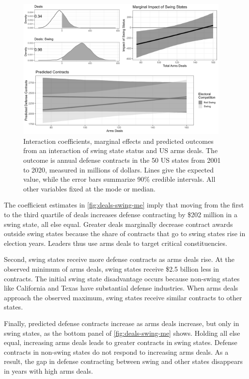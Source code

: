 \documentclass[12pt]{article}
\begin{document}
\begin{figure}[htpb]
	\centering
		\includegraphics[width=0.95\textwidth]{../figures/deals-swing-me.png}
	\caption{Interaction coefficients, marginal effects and predicted outcomes from an interaction of swing state status and US arms deals. The outcome is annual defense contracts in the 50 US states from 2001 to 2020, measured in millions of dollars. Lines give the expected value, while the error bars summarize 90\% credible intervals. All other variables fixed at the mode or median.}
	\label{fig:deals-swing-me}
\end{figure}


The coefficient estimates in \autoref{fig:deals-swing-me} imply that moving from the first to the third quartile of deals increases defense contracting by \$202 million in a swing state, all else equal. 
Greater deals marginally decrease contract awards outside swing states because the share of contracts that go to swing states rise in election years. 
Leaders thus use arms deals to target critical constituencies.


Second, swing states receive more defense contracts as arms deals rise. 
At the observed minimum of arms deals, swing states receive \$2.5 billion less in contracts.
The initial swing state disadvantage occurs because non-swing states like California and Texas have substantial defense industries.
When arms deals approach the observed maximum, swing states receive similar contracts to other states. 


Finally, predicted defense contracts increase as arms deals increase, but only in swing states, as the bottom panel of \autoref{fig:deals-swing-me} shows. 
Holding all else equal, increasing arms deals leads to greater contracts in swing states. 
Defense contracts in non-swing states do not respond to increasing arms deals.
As a result, the gap in defense contracting between swing and other states disappears in years with high arms deals. 
\end{document}
